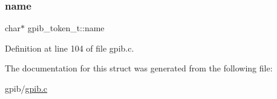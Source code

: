 \subsubsection{\texorpdfstring{name}{name}}
{\footnotesize\ttfamily char$\ast$ gpib\+\_\+token\+\_\+t\+::name}



Definition at line 104 of file gpib.\+c.



The documentation for this struct was generated from the following file\+:\begin{DoxyCompactItemize}
\item 
gpib/\hyperlink{gpib_8c}{gpib.\+c}\end{DoxyCompactItemize}
